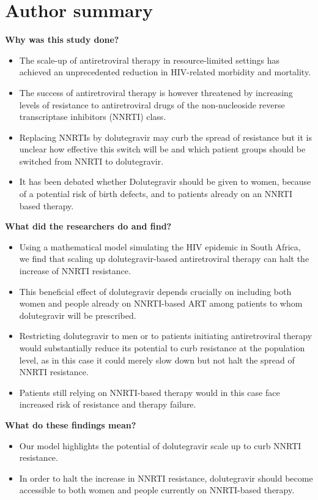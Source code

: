 \documentclass[10pt,letterpaper]{article}
\begin{document}
\section*{Author summary}
\textbf{Why was this study done?}
\begin{itemize}
\item The scale-up of antiretroviral therapy in resource-limited settings has achieved an unprecedented reduction in HIV-related morbidity and mortality. 
\item The success of antiretroviral therapy is however threatened by increasing levels of resistance to antiretroviral drugs of the non-nucleoside reverse transcriptase inhibitors (NNRTI) class. 
\item Replacing NNRTIs by dolutegravir may curb the spread of resistance but it is unclear how effective this switch will be and which patient groups should be switched from NNRTI to dolutegravir. 
\item It has been debated whether Dolutegravir should be given to women, because of a potential risk of birth defects, and to patients already on an NNRTI based therapy.
\end{itemize}
\textbf{What did the researchers do and find?}
\begin{itemize}
\item Using a mathematical model simulating the HIV epidemic in South Africa, we find that scaling up dolutegravir-based antiretroviral therapy can halt the increase of NNRTI resistance.
\item This beneficial effect of dolutegravir depends crucially on including both women and people already on NNRTI-based ART among patients to whom dolutegravir will be prescribed. 
\item Restricting dolutegravir to men or to patients initiating antiretroviral therapy would substantially reduce its potential to curb resistance at the population level, as in this case it could merely slow down but not halt the spread of NNRTI resistance. 
\item Patients still relying on NNRTI-based therapy would in this case face increased risk of resistance and therapy failure.
\end{itemize}
\textbf{What do these findings mean?}
\begin{itemize}
\item Our model highlights the potential of dolutegravir scale up to curb NNRTI resistance. 
\item In order to halt the increase in NNRTI resistance, dolutegravir should become accessible to both women and people currently on NNRTI-based therapy.
\end{itemize}
\end{document}
